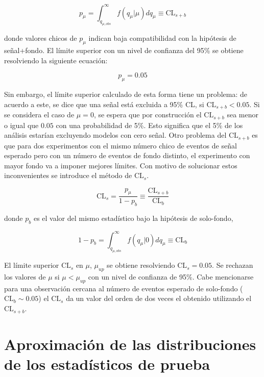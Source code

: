 \begin{equation}
	p_{\mu} = \int_{q_{\mu, obs}}^{\infty} f(q_\mu|\mu)dq_\mu \equiv \text{CL}_{s+b}
\end{equation}



donde valores chicos de $p_{\mu}$ indican baja compatibilidad con la hipótesis de señal+fondo.
El límite superior con un nivel de confianza del 95\% se obtiene resolviendo la siguiente ecuación:

\begin{equation}
	p_{\mu} = 0.05
\end{equation}

Sin embargo, el límite superior calculado de esta forma tiene un problema: de acuerdo a este, se
dice que una señal está excluida a 95\% CL, si $\text{CL}_{s+b} < 0.05$. Si se considera el caso de $\mu = 0$, se espera
que por construcción el $\text{CL}_{s+b}$ sea menor o igual que $0.05$ con una probabilidad de 5\%. Esto significa
que el 5\% de los análisis estarían excluyendo modelos con cero señal. Otro problema del $\text{CL}_{s+b}$ es que
para dos experimentos con el mismo número chico de eventos de señal esperado pero con un número
de eventos de fondo distinto, el experimento con mayor fondo va a imponer mejores límites.
Con motivo de solucionar estos inconvenientes se introduce el método de $\text{CL}_{s}$.


\begin{equation}
	\text{CL}_{s} = \frac{p_{\mu}}{1-p_{b}} \equiv \frac{\text{CL}_{s+b}}{\text{CL}_{b}}
\end{equation}

donde $p_b$ es el valor del mismo estadístico bajo la hipótesis de solo-fondo,

\begin{equation}
	1-p_b = \int_{q_{\mu, obs}}^{\infty} f(q_\mu|0)dq_\mu \equiv \text{CL}_{b}
\end{equation}

El límite superior $\text{CL}_{s}$ en $\mu$, $\mu_{up}$ se obtiene resolviendo $\text{CL}_{s} = 0.05$. Se rechazan los valores de $\mu$ si
$\mu < \mu_{up}$ con un nivel de confianza de 95\%.
Cabe mencionarse para una observación cercana al número de eventos esperado de solo-fondo
($\text{CL}_{b} \sim 0.05$) el $\text{CL}_{s}$ da un valor del orden de dos veces el obtenido utilizando el $\text{CL}_{s+b}$.


\section{Aproximación de las distribuciones de los estadísticos de prueba}

